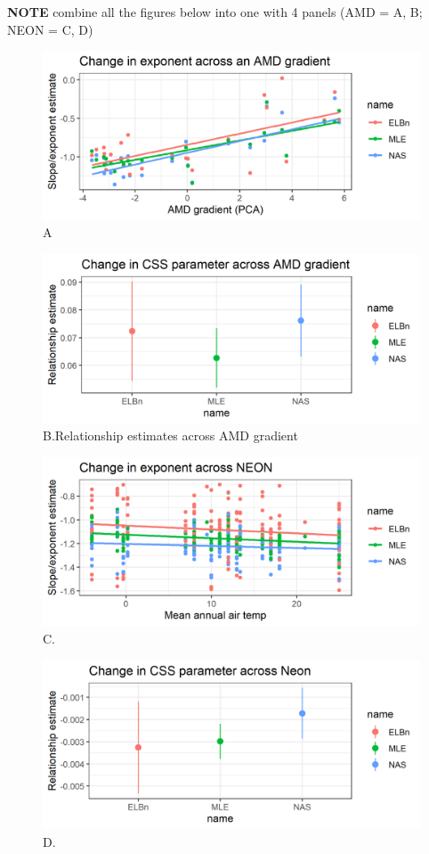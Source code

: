\documentclass[
]{article}
\begin{document}
\textbf{NOTE} combine all the figures below into one with 4 panels (AMD
= A, B; NEON = C, D)

\begin{figure}
\centering
\includegraphics{figures/AMD_plot.png}
\caption{A}
\end{figure}

\begin{figure}
\centering
\includegraphics{figures/amd_relationship.png}
\caption{B.Relationship estimates across AMD gradient}
\end{figure}

\begin{figure}
\centering
\includegraphics{figures/NEON_plot.png}
\caption{C.}
\end{figure}

\begin{figure}
\centering
\includegraphics{figures/neon_relationship.png}
\caption{D.}
\end{figure}
\end{document}
